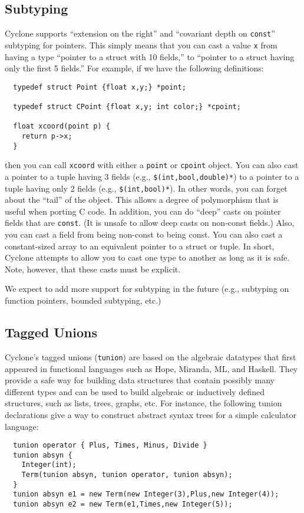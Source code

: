 \subsection{Subtyping}
Cyclone supports ``extension on the right'' and ``covariant depth on
\texttt{const}'' subtyping for pointers.  This simply means that you
can cast a value \texttt{x} from having a type ``pointer to a struct
with 10 fields,'' to ``pointer to a struct having only the first 5
fields.''  For example, if we have the following definitions:
\begin{verbatim}
  typedef struct Point {float x,y;} *point;

  typedef struct CPoint {float x,y; int color;} *cpoint;

  float xcoord(point p) {
    return p->x;
  }
\end{verbatim}
then you can call \texttt{xcoord} with either a \texttt{point} or
\texttt{cpoint} object.  You can also cast a pointer to a tuple having 3
fields (e.g., \texttt{\$(int,bool,double)*}) to a pointer to a tuple
having only 2 fields (e.g., \texttt{\$(int,bool)*}).  In other words, you
can forget about the ``tail'' of the object.  This allows a degree of
polymorphism that is useful when porting C code.  In addition, you can
do ``deep'' casts on pointer fields that are \texttt{const}.  (It is
unsafe to allow deep casts on non-const fields.)  Also, you can cast
a field from being non-const to being const.  You can also cast a
constant-sized array to an equivalent pointer to a struct or tuple.
In short, Cyclone attempts to allow you to cast one type to another as
long as it is safe.  Note, however, that these casts must be explicit.

We expect to add more support for subtyping in the future (e.g.,
subtyping on function pointers, bounded subtyping, etc.)


\subsection{Tagged Unions}

Cyclone's tagged unions (\texttt{tunion}) are based on the algebraic
datatypes that first appeared in functional languages such as Hope,
Miranda, ML, and Haskell.  They provide a safe way for building data
structures that contain possibly many different types and can be used
to build algebraic or inductively defined structures, such as lists,
trees, graphs, etc.  For instance, the following tunion declarations
give a way to construct abstract syntax trees for a simple calculator
language:
\begin{verbatim}
  tunion operator { Plus, Times, Minus, Divide }
  tunion absyn {
    Integer(int);
    Term(tunion absyn, tunion operator, tunion absyn);
  }
  tunion absyn e1 = new Term(new Integer(3),Plus,new Integer(4));
  tunion absyn e2 = new Term(e1,Times,new Integer(5));
\end{verbatim}

